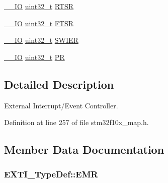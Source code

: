 \begin{DoxyCompactItemize}
\item 
\hyperlink{group___c_m_s_i_s___c_m3__core__definitions_gaec43007d9998a0a0e01faede4133d6be}{\+\_\+\+\_\+\+IO} \hyperlink{_p_e___types_8h_a33594304e786b158f3fb30289278f5af}{uint32\+\_\+t} \hyperlink{struct_e_x_t_i___type_def_ac019d211d8c880b327a1b90a06cc0675}{R\+T\+SR}
\item 
\hyperlink{group___c_m_s_i_s___c_m3__core__definitions_gaec43007d9998a0a0e01faede4133d6be}{\+\_\+\+\_\+\+IO} \hyperlink{_p_e___types_8h_a33594304e786b158f3fb30289278f5af}{uint32\+\_\+t} \hyperlink{struct_e_x_t_i___type_def_aee667dc148250bbf37fdc66dc4a9874d}{F\+T\+SR}
\item 
\hyperlink{group___c_m_s_i_s___c_m3__core__definitions_gaec43007d9998a0a0e01faede4133d6be}{\+\_\+\+\_\+\+IO} \hyperlink{_p_e___types_8h_a33594304e786b158f3fb30289278f5af}{uint32\+\_\+t} \hyperlink{struct_e_x_t_i___type_def_a5c1f538e64ee90918cd158b808f5d4de}{S\+W\+I\+ER}
\item 
\hyperlink{group___c_m_s_i_s___c_m3__core__definitions_gaec43007d9998a0a0e01faede4133d6be}{\+\_\+\+\_\+\+IO} \hyperlink{_p_e___types_8h_a33594304e786b158f3fb30289278f5af}{uint32\+\_\+t} \hyperlink{struct_e_x_t_i___type_def_a133294b87dbe6a01e8d9584338abc39a}{PR}
\end{DoxyCompactItemize}


\subsection{Detailed Description}
External Interrupt/\+Event Controller. 

Definition at line 257 of file stm32f10x\+\_\+map.\+h.



\subsection{Member Data Documentation}
\subsubsection[{\texorpdfstring{E\+MR}{EMR}}]{ E\+X\+T\+I\+\_\+\+Type\+Def\+::\+E\+MR}\hypertarget{struct_e_x_t_i___type_def_a4cd1dd7eb440dc5701f16c827e8356fa}{}\label{struct_e_x_t_i___type_def_a4cd1dd7eb440dc5701f16c827e8356fa}


